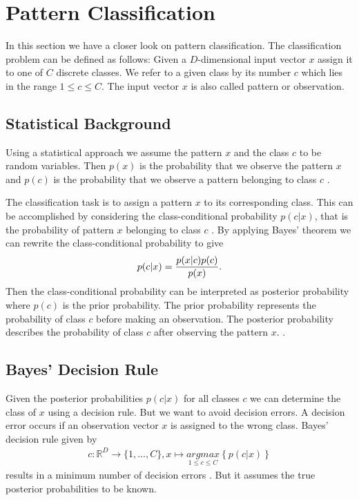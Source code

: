 \section{Pattern Classification}
\label{sec:pattern-recognition}

In this section we have a closer look on pattern classification. The classification problem can be defined as follows: Given a $D$-dimensional input vector $x$ assign it to one of $C$ discrete classes. We refer to a given class by its number $c$ which lies in the range $1 \leq c \leq C$. The input vector $x$ is also called pattern or observation.

\subsection{Statistical Background}

Using a statistical approach we assume the pattern $x$ and the class $c$ to be random variables. Then $p(x)$ is the probability that we observe the pattern $x$ and $p(c)$ is the probability that we observe a pattern belonging to class $c$ \cite[p.~108-109]{Ney:1995}.

The classification task is to assign a pattern $x$ to its corresponding class. This can be accomplished by considering the class-conditional probability $p(c|x)$, that is the probability of pattern $x$ belonging to class $c$ \cite[p.~108-109]{Ney:1995}. By applying Bayes' theorem we can rewrite the class-conditional probability to give 
\begin{align}
p(c|x) = \frac{p(x|c) p(c)}{p(x)}\onedot
\end{align}
Then the class-conditional probability can be interpreted as posterior probability where $p(c)$ is the prior probability. The prior probability represents the probability of class $c$ before making an observation. The posterior probability describes the probability of class $c$ after observing the pattern $x$. \cite[p.~38-39]{Bishop:2006}.

\subsection{Bayes' Decision Rule}

Given the posterior probabilities $p(c|x)$ for all classes $c$ we can determine the class of $x$ using a decision rule. But we want to avoid decision errors. A decision error occurs if an observation vector $x$ is assigned to the wrong class. Bayes' decision rule given by
\begin{align}
c:\mathbb{R}^D \rightarrow \{1, \ldots, C\}, x \mapsto \underset{1 \leq c \leq C}{argmax} \left\{p(c | x)\right\}
\end{align}
results in a minimum number of decision errors \cite[p.~109]{Ney:1995}. But it assumes the true posterior probabilities to be known.

